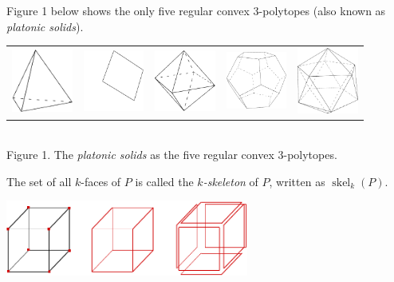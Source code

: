 \documentclass[a4paper,11pt]{report}
\begin{document}
{{  Figure 1 below shows the only five regular convex 3-polytopes (also known as
\emph{platonic solids}). \begin{center} \begin{tabular}{@{}lllll@{}}
\includegraphics[width=2cm]{figures/platonicsolids1}&
\includegraphics[width=2cm]{figures/platonicsolids2}&
\includegraphics[width=2cm]{figures/platonicsolids3}&
\includegraphics[width=2cm]{figures/platonicsolids4}&
\includegraphics[width=2cm]{figures/platonicsolids5} \end{tabular}\\\bigskip
{\small Figure 1. The \emph{platonic solids} as the five regular convex
3-polytopes.} \end{center}  

 The set of all $k$-faces of $P$ is called the \emph{$k$-skeleton} of $P$, written as  $\operatorname{skel}_k(P).$    \begin{center} \includegraphics[width=8cm]{figures/skelcube}\\ \end{center}  

}}
\end{document}
